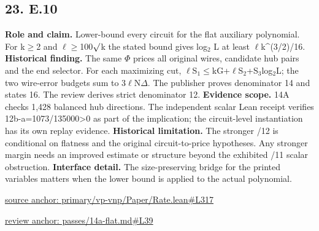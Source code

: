 \documentclass[11pt,letterpaper]{article}
\theoremstyle{definition}\newtheorem{definition}[theorem]{Definition}\newtheorem{example}[theorem]{Example}
\theoremstyle{remark}\newtheorem{remark}[theorem]{Remark}
\begin{document}
\subsection*{23. E.10}
\textbf{Role and claim.} Lower-bound every circuit for the flat auxiliary polynomial. For k\ensuremath{\ge}2 and \ensuremath{\ell}\ensuremath{\ge}100\ensuremath{\sqrt{\vphantom{x}}}k the stated bound gives log\ensuremath{{}_2} L at least \ensuremath{\ell}k\textasciicircum{}(3/2)/16.
\textbf{Historical finding.} The same \ensuremath{\Phi} prices all original wires, candidate hub pairs and the end selector. For each maximizing cut, \ensuremath{\ell}S\ensuremath{{}_1}\ensuremath{\le}kG+\ensuremath{\ell}S\ensuremath{{}_2}+S\ensuremath{{}_3}log\ensuremath{{}_2}L; the two wire-error budgets sum to 3\ensuremath{\ell}N\ensuremath{\Delta}. The publisher proves denominator 14 and states 16. The review derives strict denominator 12.
\textbf{Evidence scope.} 14A checks 1,428 balanced hub directions. The independent scalar Lean receipt verifies 12b-a=1073/135000>0 as part of the implication; the circuit-level instantiation has its own replay evidence.
\textbf{Historical limitation.} The stronger /12 is conditional on flatness and the original circuit-to-price hypotheses. Any stronger margin needs an improved estimate or structure beyond the exhibited /11 scalar obstruction.
\textbf{Interface detail.} The size-preserving bridge for the printed variables matters when the lower bound is applied to the actual polynomial.
\par\href{https://github.com/nousentllc/VP-VNP-Review/blob/8a7976933b6b2b4ffda1ad3a0dfb5fc6b6f023e8/primary/vp-vnp/Paper/Rate.lean\#L317}{source anchor: primary/vp-vnp/Paper/Rate.lean\#L317}
\par\href{https://github.com/nousentllc/VP-VNP-Review/blob/8a7976933b6b2b4ffda1ad3a0dfb5fc6b6f023e8/passes/14a-flat.md\#L39}{review anchor: passes/14a-flat.md\#L39}
\goodbreak
{}
\hypertarget{claim.24}{}
\end{document}
